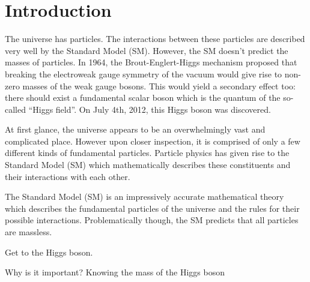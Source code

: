 \chapter{Introduction}

The universe has particles.
The interactions between these particles are described very well by the Standard Model (SM).
However, the SM doesn't predict the masses of particles.
In 1964, the Brout-Englert-Higgs mechanism proposed that breaking the electroweak gauge symmetry of the vacuum would give rise to non-zero masses of the weak gauge bosons.
This would yield a secondary effect too:
there should exist a fundamental scalar boson which is the quantum of the so-called ``Higgs field''.
On July 4th, 2012, this Higgs boson was discovered.


At first glance, the universe appears to be an overwhelmingly vast and complicated place.
However upon closer inspection, it is comprised of only a few different kinds of fundamental particles.
Particle physics has given rise to the Standard Model (SM) which mathematically describes these constituents and their interactions with each other.




The Standard Model (SM) is an impressively accurate mathematical theory which describes the fundamental particles of the universe and the rules for their possible interactions.
Problematically though, the SM predicts that all particles are massless.


Get to the Higgs boson.

Why is it important?
Knowing the mass of the Higgs boson 








